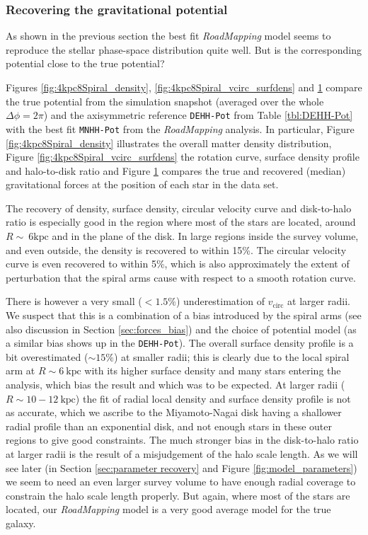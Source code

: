 \documentclass[iop,revtex4,numberedappendix,appendixfloats]{emulateapj}
\newcommand{\RM}{{\sl RoadMapping}}
\begin{document}
\begin{figure}[!htbp]
\label{fig:4kpc8Spiral_forces}
\end{figure}

\subsubsection{Recovering the gravitational potential} \label{sec:4kpc8Spiral_potential}

As shown in the previous section the best fit \RM{} model seems to reproduce the stellar phase-space distribution quite well. But is the corresponding potential close to the true potential? 

Figures \ref{fig:4kpc8Spiral_density}, \ref{fig:4kpc8Spiral_vcirc_surfdens} and \ref{fig:4kpc8Spiral_forces} compare the true potential from the simulation snapshot (averaged over the whole $\Delta\phi=2\pi$) and the axisymmetric reference \texttt{DEHH-Pot} from Table \ref{tbl:DEHH-Pot} with the best fit \texttt{MNHH-Pot} from the \RM{} analysis. In particular, Figure \ref{fig:4kpc8Spiral_density} illustrates the overall matter density distribution, Figure \ref{fig:4kpc8Spiral_vcirc_surfdens} the rotation curve, surface density profile and halo-to-disk ratio and Figure \ref{fig:4kpc8Spiral_forces} compares the true and recovered (median) gravitational forces at the position of each star in the data set.

The recovery of density, surface density, circular velocity curve and disk-to-halo ratio is especially good in the region where most of the stars are located, around $R\sim~6\text{kpc}$ and in the plane of the disk. In large regions inside the survey volume, and even outside, the density is recovered to within 15\%. The circular velocity curve is even recovered to within 5\%, which is also approximately the extent of perturbation that the spiral arms cause with respect to a smooth rotation curve.

There is however a very small ($<1.5\%$) underestimation of $v_\text{circ}$ at larger radii. We suspect that this is a combination of a bias introduced by the spiral arms (see also discussion in Section \ref{sec:forces_bias}) and the choice of potential model (as a similar bias shows up in the \texttt{DEHH-Pot}). The overall surface density profile is a bit overestimated ($\sim 15\%$) at smaller radii; this is clearly due to the local spiral arm at $R\sim6~\text{kpc}$ with its higher surface density and many stars entering the analysis, which bias the result and which was to be expected. At larger radii ($R\sim10-12~\text{kpc}$) the fit of radial local density and surface density profile is not as accurate, which we ascribe to the Miyamoto-Nagai disk having a shallower radial profile than an exponential disk, and not enough stars in these outer regions to give good constraints. The much stronger bias in the disk-to-halo ratio at larger radii is the result of a misjudgement of the halo scale length. As we will see later (in Section \ref{sec:parameter recovery} and Figure \ref{fig:model_parameters}) we seem to need an even larger survey volume to have enough radial coverage to constrain the halo scale length properly. But again, where most of the stars are located, our \RM{} model is a very good average model for the true galaxy.
\end{document}
